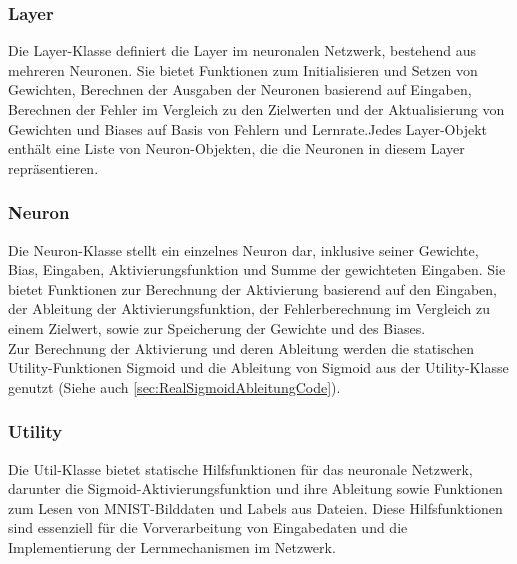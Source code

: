 \subsubsection{Layer}
\label{sec:RealLayer}
Die Layer-Klasse definiert die Layer im neuronalen Netzwerk, bestehend aus mehreren Neuronen. Sie bietet Funktionen zum Initialisieren und Setzen von Gewichten, Berechnen der Ausgaben der Neuronen basierend auf Eingaben, Berechnen der Fehler im Vergleich zu den Zielwerten und der Aktualisierung von Gewichten und Biases auf Basis von Fehlern und Lernrate.Jedes Layer-Objekt enthält eine Liste von Neuron-Objekten, die die Neuronen in diesem Layer repräsentieren. 

\subsubsection{Neuron}
\label{sec:RealNeuron}
Die Neuron-Klasse stellt ein einzelnes Neuron dar, inklusive seiner Gewichte, 
Bias, Eingaben, Aktivierungsfunktion und Summe der gewichteten Eingaben. Sie bietet Funktionen zur Berechnung der Aktivierung basierend auf den Eingaben, der Ableitung der Aktivierungsfunktion, der Fehlerberechnung im Vergleich zu einem Zielwert, sowie zur Speicherung der Gewichte und des Biases.
\\
Zur Berechnung der Aktivierung und deren Ableitung werden die statischen Utility-Funktionen Sigmoid und die Ableitung von Sigmoid aus der Utility-Klasse genutzt (Siehe auch \ref{sec:RealSigmoidAbleitungCode}).

\subsubsection{Utility}
\label{sec:RealUtility}
Die Util-Klasse bietet statische Hilfsfunktionen für das neuronale Netzwerk, darunter die Sigmoid-Aktivierungsfunktion und ihre Ableitung sowie Funktionen zum Lesen von MNIST-Bilddaten und Labels aus Dateien. Diese Hilfsfunktionen sind essenziell für die Vorverarbeitung von Eingabedaten und die Implementierung der Lernmechanismen im Netzwerk. 

